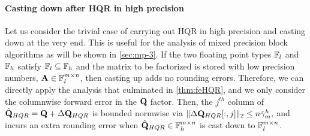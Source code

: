 \paragraph{Casting down after HQR in high precision} Let us consider the trivial case of carrying out HQR in high precision and casting down at the very end.
This is useful for the analysis of mixed precision
block algorithms as will be shown in \cref{sec:mp-3}.
If the two floating point types $\mathbb{F}_{l}$ and $\mathbb{F}_{h}$ satisfy $\mathbb{F}_{l}\subseteq \mathbb{F}_{h}$
and the matrix to be factorized is stored with low precision numbers, $\mathbf{A}\in\mathbb{F}_{l}^{m\times n}$, then casting up adds no rounding errors.
Therefore, we can directly apply the analysis that culminated in \cref{thm:feHQR}, and we only consider the columnwise forward error in the $\mathbf{Q}$ factor.
Then, the $j^{th}$ column of $\hat{\mathbf{Q}}_{HQR} = \mathbf{Q} + \Delta \mathbf{Q}_{HQR}$ is bounded normwise via $\|\Delta \mathbf{Q}_{HQR}[:,j]\|_2 \leq n\tilde{\gamma}_{m}^{h},$ and incurs an extra rounding error when $\hat{\mathbf{Q}}_{HQR}\in\mathbb{F}_{h}^{m\times n}$ is cast down to $\mathbb{F}_{l}^{m\times n}$.
